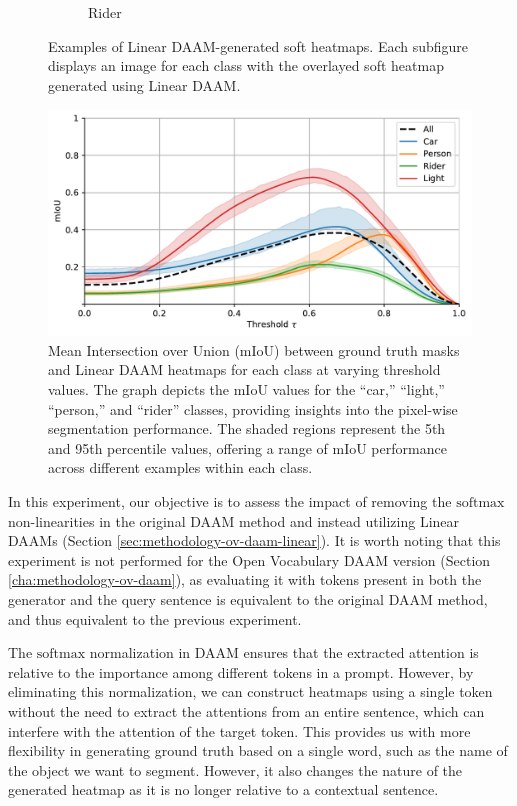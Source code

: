 \begin{figure}
\begin{subfigure}{0.24\columnwidth}
   \caption{Rider}
   \label{subfig:dataset-example-rider-daam-linear}
  \end{subfigure}
  \caption[Examples of Linear DAAM-generated soft heatmaps]{Examples of Linear DAAM-generated soft heatmaps. Each subfigure displays an image for each class with the overlayed soft heatmap generated using Linear DAAM.}
  \label{fig:dataset-examples-daam-linear}
  \end{figure}


\begin{figure}
    \centering
    \includegraphics[width=1\columnwidth]{img/4-experiments/daam-threshold-iou-experiment-min-max-linear.pdf}
    \caption[Linear DAAM mIoU curves]{Mean Intersection over Union (mIoU) between ground truth masks and Linear DAAM heatmaps for each class at varying threshold values. The graph depicts the mIoU values for the ``car,'' ``light,'' ``person,'' and ``rider'' classes, providing insights into the pixel-wise segmentation performance. The shaded regions represent the 5th and 95th percentile values, offering a range of mIoU performance across different examples within each class.}
    \label{fig:miou-class-curves-linear}
\end{figure}


In this experiment, our objective is to assess the impact of removing the $\text{softmax}$ non-linearities in the original DAAM method \cite{DAAM} and instead utilizing Linear DAAMs (Section \ref{sec:methodology-ov-daam-linear}). It is worth noting that this experiment is not performed for the Open Vocabulary DAAM version (Section \ref{cha:methodology-ov-daam}), as evaluating it with tokens present in both the generator and the query sentence is equivalent to the original DAAM method, and thus equivalent to the previous experiment.

The $\text{softmax}$ normalization in DAAM ensures that the extracted attention is relative to the importance among different tokens in a prompt. However, by eliminating this normalization, we can construct heatmaps using a single token without the need to extract the attentions from an entire sentence, which can interfere with the attention of the target token. This provides us with more flexibility in generating ground truth based on a single word, such as the name of the object we want to segment. However, it also changes the nature of the generated heatmap as it is no longer relative to a contextual sentence.

